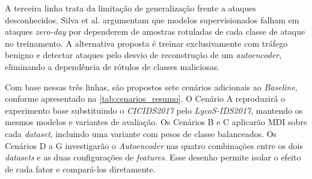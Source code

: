 A terceira linha trata da limitação de generalização frente a ataques desconhecidos. Silva et al. \cite{silva_hsae} argumentam que modelos supervisionados falham em ataques \textit{zero-day} por dependerem de amostras rotuladas de cada classe de ataque no treinamento. A alternativa proposta é treinar exclusivamente com tráfego benigno e detectar ataques pelo desvio de reconstrução de um \textit{autoencoder}, eliminando a dependência de rótulos de classes maliciosas.

Com base nessas três linhas, são propostos sete cenários adicionais ao \textit{Baseline}, conforme apresentado na \autoref{tab:cenarios_resumo}. O Cenário A reproduzirá o experimento base substituindo o \textit{CICIDS2017} pelo \textit{LycoS-IDS2017}, mantendo os mesmos modelos e variantes de avaliação. Os Cenários B e C aplicarão MDI sobre cada \textit{dataset}, incluindo uma variante com pesos de classe balanceados. Os Cenários D a G investigarão o \textit{Autoencoder} nas quatro combinações entre os dois \textit{datasets} e as duas configurações de \textit{features}. Esse desenho permite isolar o efeito de cada fator e compará-los diretamente.



